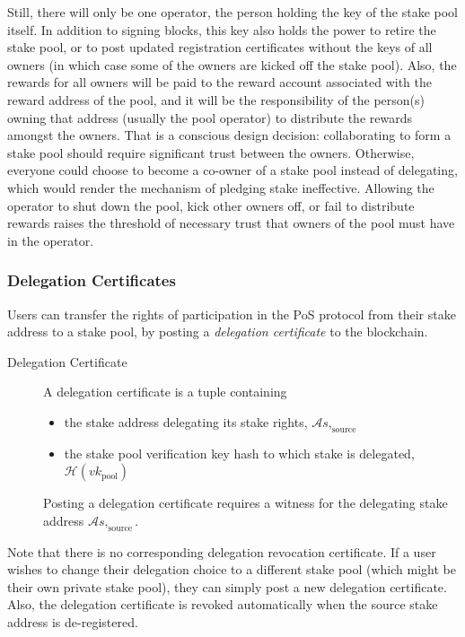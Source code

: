 \documentclass[11pt,a4paper,dvipsnames,twosided]{article}
\begin{document}
Still, there will only be one operator, the person holding the key of the stake
pool itself. In addition to signing blocks, this key also holds the power to
retire the stake pool, or to post updated registration certificates without the
keys of all owners (in which case some of the owners are kicked off the stake
pool). Also, the rewards for all owners will be paid to the reward account
associated with the reward address of the pool, and it will be the
responsibility of the person(s) owning that address (usually the pool operator) to
distribute the rewards amongst the owners.
That is a conscious design decision: collaborating to form a stake pool should
require significant trust between the owners. Otherwise, everyone could choose
to become a co-owner of a stake pool instead of delegating, which would render
the mechanism of pledging stake ineffective. Allowing the operator to shut down
the pool, kick other owners off, or fail to distribute rewards raises the
threshold of necessary trust that owners of the pool must have in the operator.

\subsubsection{Delegation Certificates}
\label{delegation-certificates}

Users can transfer the rights of participation in the PoS protocol from
their stake address to a stake pool, by posting a \emph{delegation
certificate} to the blockchain.

\begin{description}
\item[Delegation Certificate]
A delegation certificate is a tuple containing

\begin{itemize}
\item
  the stake address delegating its stake rights,
  \(\mathcal{A}{s,_\text{source}}\)
\item
  the stake pool verification key hash to which stake is delegated,
  \(\mathcal{H}(vk_\text{pool})\)
\end{itemize}

Posting a delegation certificate requires a witness for the delegating stake
address \(\mathcal{A}{s,_\text{source}}\).
\end{description}

Note that there is no corresponding delegation revocation certificate. If a user
wishes to change their delegation choice to a different stake pool (which might
be their own private stake pool), they can simply post a new delegation
certificate. Also, the delegation certificate is revoked automatically when the
source stake address is de-registered.
\end{document}
